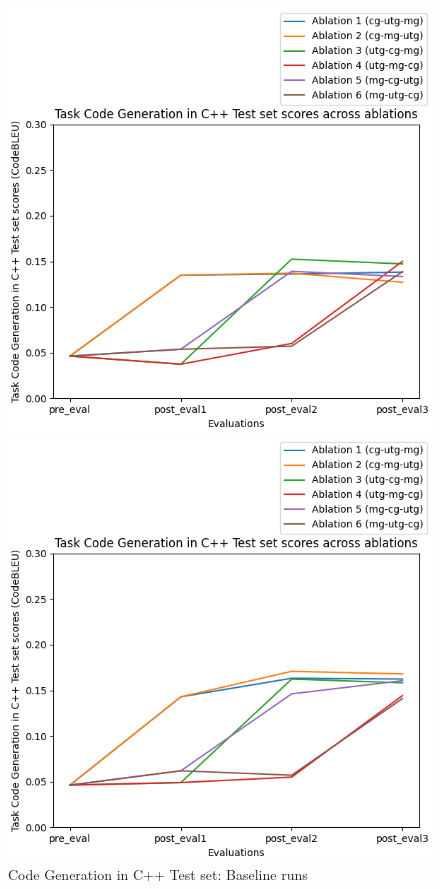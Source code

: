 \begin{figure}[H]
    \centering
    \begin{minipage}{0.45\textwidth}
        \centering
        \includegraphics[width=1.1\textwidth]{Figures/results/code_baseline_graphs/task_eval/seed_averaged_task_cg_test_eval_baseline.png} %
        \captionsetup{width=1.1\textwidth}
        \caption{Code Generation in C++ Test set: Baseline runs}
        \label{CGTestBaseline}
    \end{minipage}\hfill
    \begin{minipage}{0.45\textwidth}
        \centering
        \includegraphics[width=1.1\textwidth]{Figures/results/code_mitigation_graphs/task_eval/seed_averaged_task_cg_test_eval_mitigation.png} %

\end{minipage}
\end{figure}
